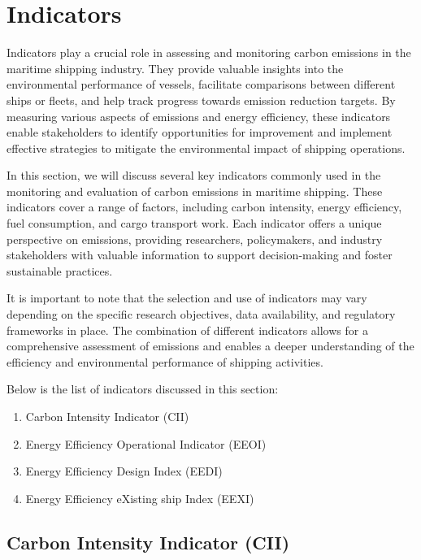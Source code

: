 \section{Indicators}

Indicators play a crucial role in assessing and monitoring carbon emissions in the maritime shipping industry.
They provide valuable insights into the environmental performance of vessels,
facilitate comparisons between different ships or fleets, and help track progress towards emission reduction targets.
By measuring various aspects of emissions and energy efficiency,
these indicators enable stakeholders to identify opportunities for improvement and implement effective strategies to mitigate the environmental impact of shipping operations.

In this section, we will discuss several key indicators commonly used in the monitoring and evaluation of carbon emissions in maritime shipping.
These indicators cover a range of factors, including carbon intensity, energy efficiency, fuel consumption, and cargo transport work.
Each indicator offers a unique perspective on emissions, providing researchers, policymakers, and industry stakeholders with valuable information to support decision-making and foster sustainable practices.

It is important to note that the selection and use of indicators may vary depending on the specific research objectives, data availability, and regulatory frameworks in place.
The combination of different indicators allows for a comprehensive assessment of emissions and enables a deeper understanding of the efficiency and environmental performance of shipping activities.

Below is the list of indicators discussed in this section:

\begin{enumerate}
    \item Carbon Intensity Indicator (CII)
    \item Energy Efficiency Operational Indicator (EEOI)
    \item Energy Efficiency Design Index  (EEDI)
    \item Energy Efficiency eXisting ship Index  (EEXI)
\end{enumerate}

\subsection{Carbon Intensity Indicator (CII)}

